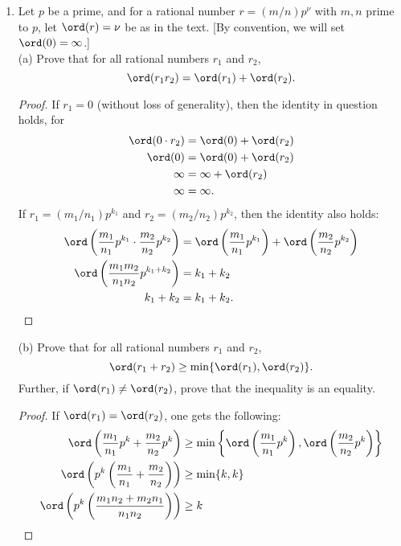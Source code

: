 \documentclass[11pt, oneside]{article}
\begin{document}
\begin{enumerate}
\begin{proof}
By Vieta's formulas \cite{vieta}, one obtains a system of $n$ distinct equations in the $n$ roots of $f(x)$ in terms of the coefficients of $f(x)$. Therefore, one can solve for each root of the polynomial in terms of the coefficients, substitute these values into the formula for the discriminant, and obtain the desired polynomial.
\end{proof}
\item Let $p$ be a prime, and for a rational number $r = (m/n)p^\nu$ with $m,n$ prime to $p$, let $\ord(r) = \nu$ be as in the text. [By convention, we will set $\ord(0)=\infty$.]\\
(a) Prove that for all rational numbers $r_1$ and $r_2$,
$$
\ord (r_1r_2) = \ord(r_1) + \ord(r_2).
$$
\begin{proof}
If $r_1=0$ (without loss of generality), then the identity in question holds, for
\begin{align*}
\ord(0\cdot r_2) &= \ord(0) + \ord(r_2)\\
\ord(0)		&=\ord(0) + \ord(r_2)\\
\infty			&= \infty + \ord(r_2)\\
\infty			&= \infty.
\end{align*}
If $r_1=(m_1/n_1)p^{k_1}$ and $r_2 = (m_2/n_2)p^{k_2}$, then the identity also holds:
\begin{align*}
\ord\left(\frac{m_1}{n_1}p^{k_1} \cdot \frac{m_2}{n_2}p^{k_2} \right) 	&= \ord\left(\frac{m_1}{n_1}p^{k_1}\right) + \ord\left(\frac{m_2}{n_2}p^{k_2}\right)\\
\ord\left(  \frac{m_1m_2}{n_1n_2}p^{k_1+k_2}  \right)				&= k_1 + k_2\\
k_1+k_2												&= k_1 + k_2.
\end{align*}
\end{proof}
(b) Prove that for all rational numbers $r_1$ and $r_2$,
$$
\ord(r_1+r_2) \ge  \min\{  \ord(r_1),\ord(r_2)  \}.
$$
Further, if $\ord(r_1) \neq\ord(r_2)$, prove that the inequality is an equality.
\begin{proof}
If $\ord(r_1) = \ord(r_2)$, one gets the following:
\begin{align*}
\ord\left(\frac{m_1}{n_1}p^{k} + \frac{m_2}{n_2}p^{k} \right) &\ge  \min\left\{    \ord\left(\frac{m_1}{n_1}p^{k}\right) , \ord\left(\frac{m_2}{n_2}p^{k}\right)\right\}\\
\ord\left(p^k\left(\frac{m_1}{n_1} + \frac{m_2}{n_2} \right)\right) & \ge  \min\{k,k\}\\
\ord\left(p^k\left(\frac{m_1n_2 + m_2n_1}{n_1n_2} \right)\right) &\ge  k\\

\end{align*}
\end{proof}
\end{enumerate}
\end{document}
